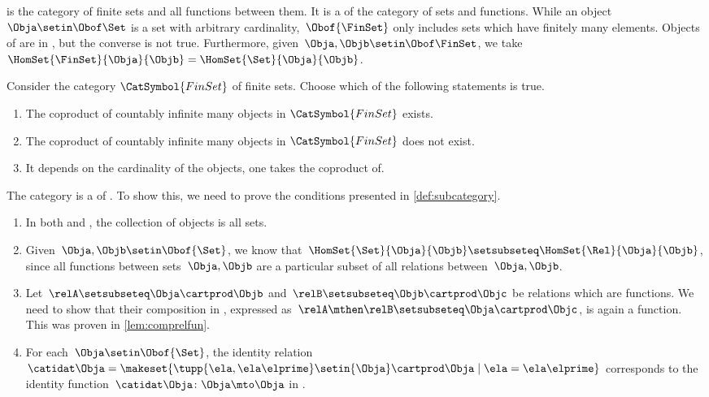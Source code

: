\begin{example}[\FinSet]
    \label{ex:FinSet}
    \FinSet is the category of finite sets and all functions between them.
    It is a  of the category \Set of sets and functions.
    While an object~$\Obja \setin \Obof\Set$ is a set with arbitrary cardinality,~$\Obof{\FinSet}$ only includes sets which have finitely many elements.
    Objects of \FinSet are in \Set, but the converse is not true.
    Furthermore, given~$\Obja,\Objb\setin \Obof\FinSet$, we take~$\HomSet{\FinSet}{\Obja}{\Objb} =\HomSet{\Set}{\Obja}{\Objb}$.
\end{example} 
\begin{quiz}
Consider the category $\CatSymbol{FinSet}$ of finite sets. Choose which of the following statements is true.
\begin{enumerate}[label=(\alph*)]
\item The coproduct of countably infinite many objects in $\CatSymbol{FinSet}$ exists.
\item The coproduct of countably infinite many objects in $\CatSymbol{FinSet}$ does not exist.
\item It depends on the cardinality of the objects, one takes the coproduct of.
\end{enumerate}
\end{quiz}

\begin{example}
    The category \Set is a  of \Rel.
    To show this, we need to prove the conditions presented in \cref{def:subcategory}.
    \begin{enumerate}
        \item In both \Rel and \Set, the collection of objects is all sets.
        \item Given~$\Obja,\Objb\setin \Obof{\Set}$, we know that~$\HomSet{\Set}{\Obja}{\Objb}\setsubseteq \HomSet{\Rel}{\Obja}{\Objb}$, since all functions between sets~$\Obja,\Objb$ are a particular subset of all relations between~$\Obja,\Objb$.
        \item Let~$\relA\setsubseteq \Obja\cartprod \Objb$ and~$\relB\setsubseteq \Objb \cartprod \Objc$ be relations which are functions.
              We need to show that their composition in \Rel, expressed as~$\relA\mthen \relB\setsubseteq \Obja\cartprod \Objc$, is again a function.
              This was proven in \cref{lem:comprelfun}.
        \item For each~$\Obja \setin \Obof{\Set}$, the identity relation~$\catidat\Obja=\makeset{\tupp{\ela,\ela\elprime}\setin {\Obja} \cartprod \Obja \mid \ela=\ela\elprime}$ corresponds to the identity function~$\catidat\Obja \colon \Obja \mto \Obja$ in \Set.
    \end{enumerate}
\end{example}
